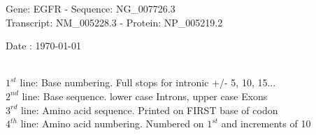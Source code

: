 \documentclass{article}
\begin{document}
\renewcommand{\footrulewidth}{1pt}
\renewcommand{\headrulewidth}{0pt}
\begin{center}
\begin{large}
Gene: EGFR - Sequence: NG\_007726.3\\
Transcript: NM\_005228.3 - Protein: NP\_005219.2
 
 Date : \today\\\\
\end{large}
\end{center}
$1^{st}$ line: Base numbering. Full stops for intronic +/- 5, 10, 15...\\
$2^{nd}$ line: Base sequence. lower case Introns, upper case Exons\\
$3^{rd}$ line: Amino acid sequence. Printed on FIRST base of codon\\
$4^{th}$ line: Amino acid numbering. Numbered on $1^{st}$ and increments of 10\\
\end{document}
